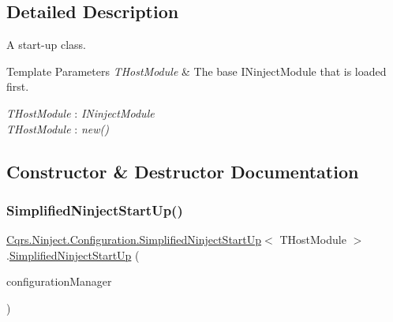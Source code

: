 \subsection{Detailed Description}
A start-\/up class. 


\begin{DoxyTemplParams}{Template Parameters}
{\em T\+Host\+Module} & The base I\+Ninject\+Module that is loaded first.\\
\hline
\end{DoxyTemplParams}
\begin{Desc}
\item[Type Constraints]\begin{description}
\item[{\em T\+Host\+Module} : {\em I\+Ninject\+Module}]\item[{\em T\+Host\+Module} : {\em new()}]\end{description}
\end{Desc}


\subsection{Constructor \& Destructor Documentation}
\mbox{\label{classCqrs_1_1Ninject_1_1Configuration_1_1SimplifiedNinjectStartUp_acfbce6e504d9efb64bcfc8d612d28f95_acfbce6e504d9efb64bcfc8d612d28f95}} 
\subsubsection{\texorpdfstring{Simplified\+Ninject\+Start\+Up()}{SimplifiedNinjectStartUp()}}
{\footnotesize\ttfamily \hyperlink{classCqrs_1_1Ninject_1_1Configuration_1_1SimplifiedNinjectStartUp}{Cqrs.\+Ninject.\+Configuration.\+Simplified\+Ninject\+Start\+Up}$<$ T\+Host\+Module $>$.\hyperlink{classCqrs_1_1Ninject_1_1Configuration_1_1SimplifiedNinjectStartUp}{Simplified\+Ninject\+Start\+Up} (\begin{DoxyParamCaption}\item[{\hyperlink{interfaceCqrs_1_1Configuration_1_1IConfigurationManager}{I\+Configuration\+Manager}}]{configuration\+Manager }\end{DoxyParamCaption})}



